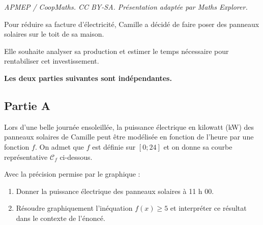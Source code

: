 \documentclass[10pt]{article}
\begin{document}
\noindent\textit{APMEP / CoopMaths. CC BY-SA. Présentation adaptée par Maths Explorer.}\par\medskip
Pour réduire sa facture d'électricité, Camille a décidé de faire poser des panneaux solaires sur le toit de sa maison.

Elle souhaite analyser sa production et estimer le temps nécessaire pour rentabiliser cet investissement.

\textbf{Les deux parties suivantes sont indépendantes.}

\subsection*{Partie A}

Lors d'une belle journée ensoleillée, la puissance électrique en kilowatt (kW) des panneaux solaires de Camille peut être modélisée en fonction de l'heure par une fonction $f$. On admet que $f$ est définie sur $[0 ; 24]$ et on donne sa courbe représentative $\mathcal{C}_{f}$ ci-dessous.

Avec la précision permise par le graphique :

\begin{center}
\end{center}















\begin{enumerate}
	\item Donner la puissance électrique des panneaux solaires à 11 h 00.

	\item Résoudre graphiquement l'inéquation \quad $f(x) \geqslant 5$ \quad et interpréter ce résultat dans le contexte de l'énoncé.
\end{enumerate}
\end{document}
